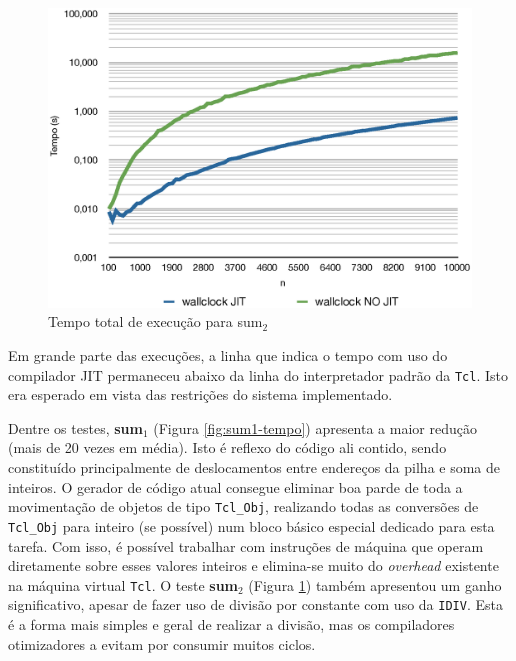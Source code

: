 \begin{figure}[ht!]
  \centering
  \includegraphics[scale=0.70]{figs/sum2_tempo}
  \caption{Tempo total de execução para sum$_2$ \label{fig:sum2-tempo}}
\end{figure}

Em grande parte das execuções, a linha que indica o tempo com uso
do compilador JIT permaneceu abaixo da linha do interpretador padrão da
\texttt{Tcl}. Isto era esperado em vista das restrições do sistema
implementado.

Dentre os testes, \textbf{sum$_1$} (Figura
\ref{fig:sum1-tempo}) apresenta a maior
redução (mais de 20 vezes em média). Isto é reflexo do código ali
contido, sendo constituído principalmente de deslocamentos entre
endereços da pilha e soma de inteiros. O gerador de código atual
consegue eliminar boa parde de toda a movimentação de objetos de tipo
\verb!Tcl_Obj!, realizando todas as conversões de \verb!Tcl_Obj! para
inteiro (se possível) num bloco básico especial dedicado para esta
tarefa.
Com isso, é possível trabalhar com instruções de máquina que operam
diretamente sobre esses valores inteiros e elimina-se muito do
\textit{overhead} existente na máquina virtual \texttt{Tcl}. O teste
\textbf{sum$_2$} (Figura \ref{fig:sum2-tempo}) também
apresentou um ganho significativo, apesar de fazer uso de divisão por
constante com uso da \verb!IDIV!. Esta é a forma mais simples e geral de
realizar a divisão, mas os compiladores otimizadores a evitam
\cite{opt-invariantintdiv} por consumir muitos ciclos.


